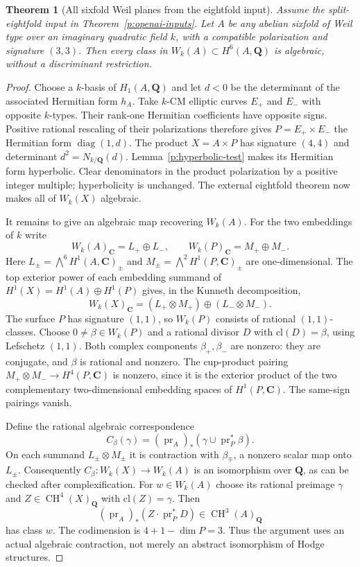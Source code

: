 \documentclass[11pt,reqno]{article}
\theoremstyle{emphasizedplain}
\theoremstyle{emphasizeddefinition}
\theoremstyle{emphasizeddefinition}
\newtheorem{pretheorem}[prelemma]{Theorem}
\DeclareMathOperator{\CH}{CH}
\newcommand{\Q}{\mathbf Q}
\newcommand{\C}{\mathbf C}
\begin{document}
\begin{pretheorem}[All sixfold Weil planes from the eightfold input]
\label{p:all-sixfold-weil}
Assume the split-eightfold input in Theorem~\ref{p:openai-inputs}.
Let $A$ be any abelian sixfold of Weil type over an imaginary quadratic
field $k$, with a compatible polarization and signature $(3,3)$.
Then every class in $W_k(A)\subset H^6(A,\Q)$ is algebraic,
without a discriminant restriction.
\end{pretheorem}
\begin{proof}
Choose a $k$-basis of $H_1(A,\Q)$ and let $d<0$ be the determinant
of the associated Hermitian form $h_A$.
Take $k$-CM elliptic curves $E_+$ and $E_-$ with opposite $k$-types.
Their rank-one Hermitian coefficients have opposite signs.
Positive rational rescaling of their polarizations therefore gives
$P=E_+\times E_-$ the Hermitian form $\operatorname{diag}(1,d)$.
The product $X=A\times P$ has signature $(4,4)$ and determinant
$d^2=N_{k/\Q}(d)$. Lemma~\ref{p:hyperbolic-test} makes its
Hermitian form hyperbolic. Clear denominators in the product
polarization by a positive integer multiple; hyperbolicity is unchanged.
The external eightfold theorem now makes all of $W_k(X)$ algebraic.

It remains to give an algebraic map recovering $W_k(A)$.
For the two embeddings of $k$ write
\[
 W_k(A)_\C=L_+\oplus L_-,\qquad
 W_k(P)_\C=M_+\oplus M_-.
\]
Here $L_\pm=\bigwedge^6 H^1(A,\C)_\pm$ and
$M_\pm=\bigwedge^2 H^1(P,\C)_\pm$ are one-dimensional.
The top exterior power of each embedding summand of
$H^1(X)=H^1(A)\oplus H^1(P)$ gives, in the Kunneth decomposition,
\[
 W_k(X)_\C=(L_+\otimes M_+)\oplus(L_-\otimes M_-).
\]
The surface $P$ has signature $(1,1)$, so $W_k(P)$ consists of
rational $(1,1)$-classes. Choose $0\ne\beta\in W_k(P)$ and a
rational divisor $D$ with $\mathrm{cl}(D)=\beta$, using Lefschetz
$(1,1)$. Both complex components $\beta_+,\beta_-$ are nonzero:
they are conjugate, and $\beta$ is rational and nonzero.
The cup-product pairing $M_+\otimes M_-\to H^4(P,\C)$ is
nonzero, since it is the exterior product of the two complementary
two-dimensional embedding spaces of $H^1(P,\C)$.
The same-sign pairings vanish.

Define the rational algebraic correspondence
\[
 C_\beta(\gamma)=(\operatorname{pr}_A)_*
       (\gamma\cup\operatorname{pr}_P^*\beta).
\]
On each summand $L_\pm\otimes M_\pm$ it is contraction with
$\beta_\mp$, a nonzero scalar map onto $L_\pm$.
Consequently $C_\beta:W_k(X)\to W_k(A)$ is an isomorphism over
$\Q$, as can be checked after complexification.
For $w\in W_k(A)$ choose its rational preimage $\gamma$ and
$Z\in\CH^4(X)_\Q$ with $\mathrm{cl}(Z)=\gamma$.
Then
\[
 (\operatorname{pr}_A)_*(Z\cdot\operatorname{pr}_P^*D)
       \in\CH^3(A)_\Q
\]
has class $w$. The codimension is $4+1-\dim P=3$.
Thus the argument uses an actual algebraic contraction, not merely
an abstract isomorphism of Hodge structures.
\end{proof}
\end{document}
